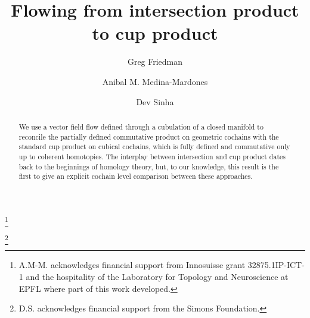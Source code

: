 \documentclass{amsart}
\theoremstyle{definition}
\begin{document}
\title{Flowing from intersection product to cup product}

\author[G. Friedman]{Greg Friedman}
\address{Department of Mathematics, Texas Christian University}

\author[A. Medina-Mardones]{Anibal M. Medina-Mardones}
\address{Max Planck Institute for Mathematics, Bonn, Germany}
\address{Department of Mathematics, University of Notre, Notre Dame, IN, USA}
\thanks{A.M-M. acknowledges financial support from Innosuisse grant \mbox{32875.1IP-ICT-1} and the hospitality of the Laboratory for Topology and Neuroscience at EPFL where part of this work developed.}

\author[D. Sinha]{Dev Sinha}
\address{Mathematics Department, University of Oregon}
\thanks{D.S. acknowledges financial support from the Simons Foundation.}


\begin{abstract}
	We use a vector field flow defined through a cubulation of a closed manifold to reconcile the partially defined commutative product on geometric cochains with the standard cup product on cubical cochains, which is fully defined and commutative only up to coherent homotopies. The interplay between intersection and cup product dates back to the beginnings of homology theory, but, to our knowledge, this result is the first to give an explicit cochain level comparison between these approaches.
\end{abstract}

\maketitle
\tableofcontents
\sloppy
\printbibliography
\end{document}
